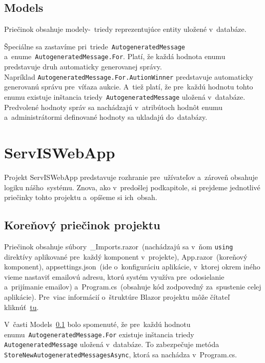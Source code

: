 \subsection{Models}
\label{models}

Priečinok obsahuje modely-~triedy reprezentujúce entity uložené v~databáze.

Špeciálne sa zastavíme pri~triede~\verb|AutogeneratedMessage|\\a~enume~\verb|AutogeneratedMessage.For|. Platí, že každá hodnota enumu predstavuje druh automaticky generovanej správy.\\Napríklad \verb|AutogeneratedMessage.For.AutionWinner| predstavuje automaticky generovanú správu pre~víťaza aukcie. A~tiež platí, že pre~každú hodnotu tohto enumu existuje inštancia triedy~\verb|AutogeneratedMessage| uložená v~databáze.\\Pred\-vo\-le\-né hodnoty správ sa nachádzajú v~atribútoch hodnôt enumu a~administrátormi definované hodnoty sa ukladajú do~databázy.

\section{ServISWebApp}

Projekt ServISWebApp predstavuje rozhranie pre~užívateľov a~zároveň obsahuje logiku nášho~systému. Znova, ako v~predošlej podkapitole, si prejdeme jednotlivé priečinky tohto projektu a~opíšeme si ich~obsah.

\subsection{Koreňový priečinok projektu}

Priečinok obsahuje súbory~\_Imports.razor~(nachádzajú sa v~ňom \verb|using| direktívy aplikované pre~každý komponent v~projekte), App.razor~(koreňový komponent), appsettings.json~(ide o~konfiguráciu aplikácie, v~ktorej okrem iného vieme nastaviť emailovú adresu, ktorú systém využíva pre~odosielanie a~prijímanie emailov) a~Program.cs~(obsahuje kód zodpovedný za~spustenie celej aplikácie). Pre~viac informácií o~štruktúre Blazor projektu môže čítateľ kliknúť~\href{https://learn.microsoft.com/en-us/aspnet/core/blazor/project-structure?view=aspnetcore-7.0}{tu}.

V~časti Models~\ref{models} bolo spomenuté, že pre~každú hodnotu\\enumu~\verb|AutogeneratedMessage.For| existuje inštancia triedy\\\verb|AutogeneratedMessage| uložená v~databáze. To zabezpečuje metóda\\\verb|StoreNewAutogeneratedMessagesAsync|, ktorá sa nachádza v~Program.cs.

